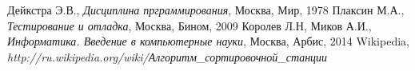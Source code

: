 \begin{thebibliography}{99}
  Дейкстра Э.В.,
  \emph{Дисциплина прграммирования},
  Москва, Мир,
  1978
  Плаксин М.А.,
  \emph{Тестирование и отладка},
  Москва, Бином,
  2009
  Королев Л.Н, Миков А.И.,
  \emph{Информатика. Введение в компьютерные науки},
  Москва, Арбис,
  2014
  Wikipedia,
  \emph{http://ru.wikipedia.org/wiki/Алгоритм\_сортировочной\_станции}
\end{thebibliography}
\pagebreak
